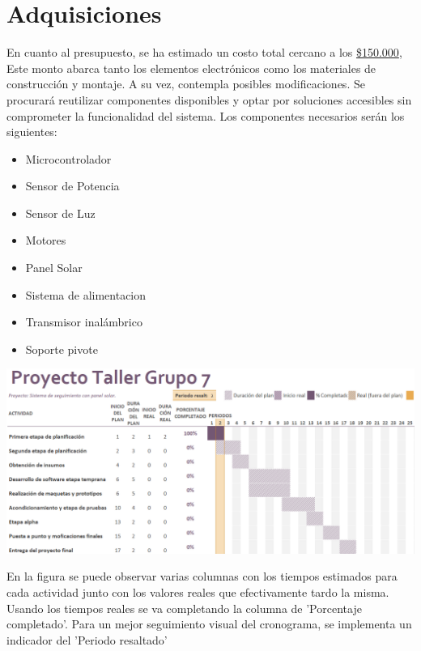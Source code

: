 \documentclass[a4paper,12pt]{article}
\begin{document}
\section{Adquisiciones}
En cuanto al presupuesto, se ha estimado un costo total cercano a los \hyperref[tabla]{\$150.000}, Este monto abarca tanto los elementos electrónicos como los materiales de construcción y montaje. A su vez, contempla posibles modificaciones. Se procurará reutilizar componentes disponibles y optar por soluciones accesibles sin comprometer la funcionalidad del sistema. Los componentes necesarios serán los siguientes: \\
\begin{itemize}
\item Microcontrolador
\item Sensor de Potencia
\item Sensor de Luz
\item Motores
\item Panel Solar
\item Sistema de alimentacion
\item Transmisor inalámbrico
\item Soporte pivote
\end{itemize}


\newpage
\begin{landscape}
    \thispagestyle{empty} %
    \begin{center}
        \includegraphics[width=0.95\linewidth]{grantt-V3.png}
        \label{cronograma}
    \end{center}
    En la figura se puede observar varias columnas con los tiempos estimados para cada actividad junto con los valores reales que efectivamente tardo la misma. Usando los tiempos reales se va completando la columna de 'Porcentaje completado'. Para un mejor seguimiento visual del cronograma, se implementa un indicador del 'Periodo resaltado'
\end{landscape}
\end{document}
